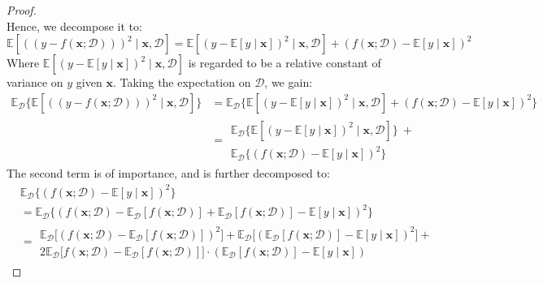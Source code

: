 \begin{proof}
\begin{equation}
    \end{equation}
    Hence, we decompose it to: 
    \begin{equation}
        \mathbb{E} \left[((y-f(\mathbf{x};\mathcal{D})))^{2}\mid \mathbf{x}, \mathcal{D}\right] = \mathbb{E}\left[(y-\mathbb{E}[y\mid \mathbf{x}])^{2}\mid \mathbf{x},\mathcal{D}\right] + (f(\mathbf{x};\mathcal{D})-\mathbb{E}[y\mid \mathbf{x}])^{2}
    \end{equation}
    Where $\mathbb{E}\left[(y-\mathbb{E}[y\mid \mathbf{x}])^{2}\mid \mathbf{x},\mathcal{D}\right]$ is regarded to be a relative constant of variance on $y$ given $\mathbf{x}$. Taking the expectation on $\mathcal{D}$, we gain: 
    \begin{equation}
        \begin{split}
            \mathbb{E}_{\mathcal{D}} \Big\{ \mathbb{E} \left[((y-f(\mathbf{x};\mathcal{D})))^{2}\mid \mathbf{x}, \mathcal{D}\right]\Big\} & = \mathbb{E}_{\mathcal{D}} \Big\{\mathbb{E}\left[(y-\mathbb{E}[y\mid \mathbf{x}])^{2}\mid \mathbf{x},\mathcal{D}\right] + (f(\mathbf{x};\mathcal{D})-\mathbb{E}[y\mid \mathbf{x}])^{2}\Big\}\\
            & = \begin{multlined}
                \mathbb{E}_{\mathcal{D}} \Big\{ \mathbb{E}\left[(y-\mathbb{E}[y\mid \mathbf{x}])^{2}\mid \mathbf{x},\mathcal{D}\right]\Big\} \: + \\ \mathbb{E}_{\mathcal{D}} \Big\{ (f(\mathbf{x};\mathcal{D})-\mathbb{E}[y\mid \mathbf{x}])^{2}\Big\}
            \end{multlined}
        \end{split}
    \end{equation}
    The second term is of importance, and is further decomposed to: 
    \begin{equation}
        \begin{split}
            & \mathbb{E}_{\mathcal{D}} \Big\{ (f(\mathbf{x};\mathcal{D})-\mathbb{E}[y\mid \mathbf{x}])^{2}\Big\} \\ 
            & = \mathbb{E}_{\mathcal{D}} \Big\{ (f(\mathbf{x};\mathcal{D})- \mathbb{E}_{\mathcal{D}}[f(\mathbf{x};\mathcal{D})] + \mathbb{E}_{\mathcal{D}}[f(\mathbf{x};\mathcal{D})] -\mathbb{E}[y\mid \mathbf{x}])^{2}\Big\} \\
            & = \begin{multlined}
                \mathbb{E}_{\mathcal{D}} \Big[(f(\mathbf{x};\mathcal{D})-\mathbb{E}_{\mathcal{D}}[f(\mathbf{x};\mathcal{D})])^{2}\Big] + \mathbb{E}_{\mathcal{D}} \Big[ (\mathbb{E}_{\mathcal{D}} [f(\mathbf{x};\mathcal{D})] - \mathbb{E}[y\mid \mathbf{x}])^{2} \Big] + \\2\mathbb{E}_{\mathcal{D}}\Big[f(\mathbf{x};\mathcal{D})-\mathbb{E}_{\mathcal{D}}[f(\mathbf{x};\mathcal{D})]\Big]\cdot (\mathbb{E}_{\mathcal{D}}[f(\mathbf{x};\mathcal{D})]-\mathbb{E}[y\mid \mathbf{x}])

\end{multlined}
\end{split}
\end{equation}
\end{proof}
